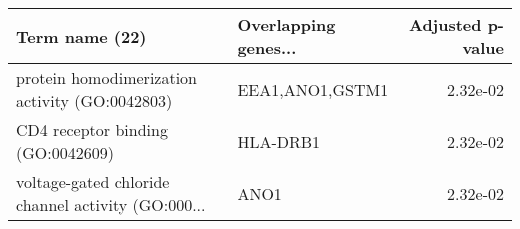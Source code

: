 \begin{tabular}{llr}
\toprule
                                    Term name (22) & Overlapping genes... &  Adjusted p-value \\
\midrule
    protein homodimerization activity (GO:0042803) &      EEA1,ANO1,GSTM1 &          2.32e-02 \\
                 CD4 receptor binding (GO:0042609) &             HLA-DRB1 &          2.32e-02 \\
voltage-gated chloride channel activity (GO:000... &                 ANO1 &          2.32e-02 \\
\bottomrule
\end{tabular}
